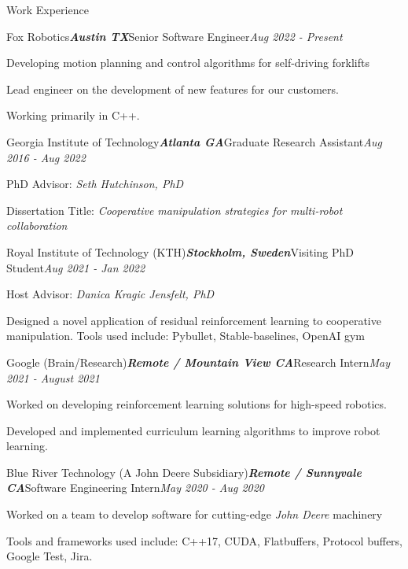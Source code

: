 \documentclass{resume} %
\begin{document}
\begin{rSection}{Work Experience}
\begin{rSubsection}{Fox Robotics}{\bf \em Austin TX}{Senior Software Engineer}{\em Aug 2022 - Present}
\item Developing motion planning and control algorithms for self-driving forklifts
\item Lead engineer on the development of new features for our customers.
\item Working primarily in C++.
\end{rSubsection}

\begin{rSubsection}{Georgia Institute of Technology}{\bf \em Atlanta GA}{Graduate Research Assistant}{\em Aug 2016 - Aug 2022}
\item PhD Advisor: {\em Seth Hutchinson, PhD}
\item Dissertation Title: {\em Cooperative manipulation strategies for multi-robot collaboration}
\end{rSubsection}

\begin{rSubsection}{Royal Institute of Technology (KTH)}{\bf \em Stockholm, Sweden}{Visiting PhD Student}{\em Aug 2021 - Jan 2022}
\item Host Advisor: {\em Danica Kragic Jensfelt, PhD}
\item Designed a novel application of residual reinforcement learning to cooperative manipulation. Tools used include: Pybullet, Stable-baselines, OpenAI gym
\end{rSubsection}

\begin{rSubsection}{Google (Brain/Research)}{\bf \em Remote / Mountain View CA}{Research Intern}{\em May 2021 - August 2021}
\item Worked on developing reinforcement learning solutions for high-speed robotics.
\item Developed and implemented curriculum learning algorithms to improve robot learning.
\end{rSubsection}

\begin{rSubsection}{Blue River Technology (A John Deere Subsidiary)}{\bf \em Remote / Sunnyvale CA}{Software Engineering Intern}{\em May 2020 - Aug 2020}
\item Worked on a team to develop software for cutting-edge {\em John Deere} machinery
\item Tools and frameworks used include: C++17, CUDA, Flatbuffers, Protocol buffers, Google Test, Jira.
\end{rSubsection}


\end{rSection}
\end{document}
